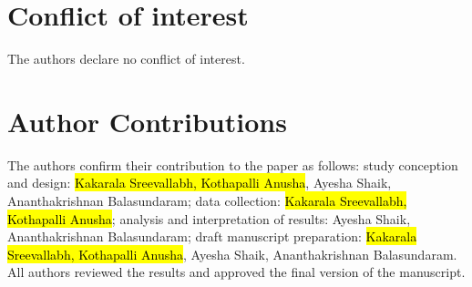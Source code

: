 \documentclass[utf8]{FrontiersinHarvard}
\begin{document}
\section*{Conflict of interest}
The authors declare no conflict of interest.

\section*{Author Contributions}
The authors confirm their contribution to the paper as follows: study conception and design: \hl{Kakarala Sreevallabh, Kothapalli Anusha}, Ayesha Shaik, Ananthakrishnan Balasundaram; data collection: \hl{Kakarala Sreevallabh, Kothapalli Anusha}; analysis and interpretation of results: Ayesha Shaik, Ananthakrishnan Balasundaram; draft manuscript preparation: \hl{Kakarala Sreevallabh, Kothapalli Anusha}, Ayesha Shaik, Ananthakrishnan Balasundaram. All authors reviewed the results and approved the final version of the manuscript.



\end{document}
